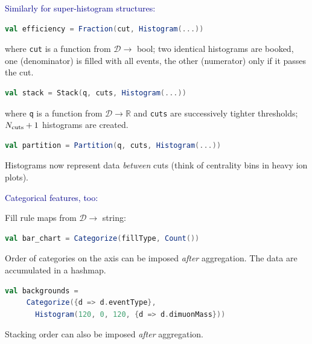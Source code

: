 \documentclass{beamer}
\begin{document}
\begin{frame}[fragile]{}
\textcolor{darkblue}{\large Similarly for super-histogram structures:}

\vspace{0.5 cm}
\begin{lstlisting}[language=scala]
val efficiency = Fraction(cut, Histogram(...))
\end{lstlisting}
where {\tt \small cut} is a function from $\mathcal{D} \to$ bool; two identical histograms are booked, one (denominator) is filled with all events, the other (numerator) only if it passes the cut.

\vfill
\begin{lstlisting}[language=scala]
val stack = Stack(q, cuts, Histogram(...))
\end{lstlisting}
where {\tt \small q} is a function from $\mathcal{D} \to \mathbb{R}$ and {\tt \small cuts} are successively tighter thresholds; $N_{\mbox{\scriptsize cuts}} + 1$ histograms are created.

\vfill
\begin{lstlisting}[language=scala]
val partition = Partition(q, cuts, Histogram(...))
\end{lstlisting}
Histograms now represent data {\it between} cuts (think of centrality bins in heavy ion plots).
\end{frame}

\begin{frame}[fragile]{}
\textcolor{darkblue}{\large Categorical features, too:}

\vfill
Fill rule maps from $\mathcal{D} \to$ string:
\begin{lstlisting}[language=scala]
val bar_chart = Categorize(fillType, Count())
\end{lstlisting}
Order of categories on the axis can be imposed {\it after} aggregation. The data are accumulated in a hashmap.

\vfill
\begin{lstlisting}[language=scala]
val backgrounds =
     Categorize({d => d.eventType},
       Histogram(120, 0, 120, {d => d.dimuonMass}))
\end{lstlisting}

Stacking order can also be imposed {\it after} aggregation.
\end{frame}
\end{document}
